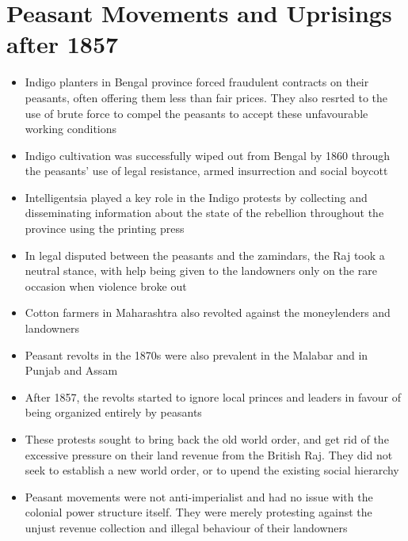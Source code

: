 \section{Peasant Movements and Uprisings after 1857}
\begin{itemize}
    \item Indigo planters in Bengal province forced fraudulent contracts on their peasants, often offering them less than fair prices. They also resrted to the use of brute force to compel the peasants to accept these unfavourable working conditions
    \item Indigo cultivation was successfully wiped out from Bengal by 1860 through the peasants' use of legal resistance, armed insurrection and social boycott
    \item Intelligentsia played a key role in the Indigo protests by collecting and disseminating information about the state of the rebellion throughout the province using the printing press
    \item In legal disputed between the peasants and the \glspl{zamindar}, the Raj took a neutral stance, with help being given to the landowners only on the rare occasion when violence broke out
    \item Cotton farmers in Maharashtra also revolted against the moneylenders and landowners
    \item Peasant revolts in the 1870s were also prevalent in the Malabar and in Punjab and Assam
    \item After 1857, the revolts started to ignore local princes and leaders in favour of being organized entirely by peasants
    \item These protests sought to bring back the old world order, and get rid of the excessive pressure on their land revenue from the British Raj. They did not seek to establish a new world order, or to  upend the existing social hierarchy
    \item Peasant movements were not anti-imperialist and had no issue with the colonial power structure itself. They were merely protesting against the unjust revenue collection and illegal behaviour of their landowners
\end{itemize}

